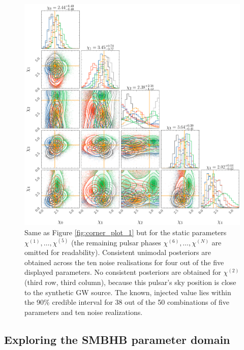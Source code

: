 \documentclass[fleqn,usenatbib,useAMS]{mnras}
\begin{document}
	\begin{figure}
	\includegraphics[width=\columnwidth, height =\columnwidth ]{images/corner_lowSNR_chi_n4000}
	\caption{Same as Figure \ref{fig:corner_plot_1}	but for the static parameters $\chi^{(1)}, \dots, \chi^{(5)}$ (the remaining pulsar phases $\chi^{(6)}, \dots, \chi^{(N)}$ are omitted for readability). Consistent unimodal posteriors are obtained across the ten noise realisations for four out of the five displayed parameters. No consistent posteriors are obtained for $\chi^{(2)}$ (third row, third column), because this pulsar's sky position is close to the synthetic GW source. The known, injected value lies within the 90\% credible interval for 38 out of the 50 combinations of five parameters and ten noise realizations.}
	\label{fig:corner_plot_3}
\end{figure}



\subsection{Exploring the SMBHB parameter domain} \label{sec:parameter_space} 
\end{document}
